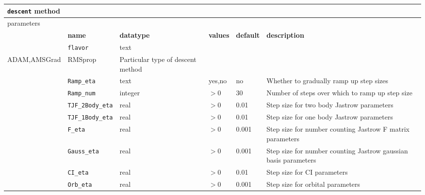 \begin{table}[H]
\begin{center}
\begin{tabularx}{\textwidth}{l l l l l X }
\hline
\multicolumn{6}{l}{\texttt{descent} method} \\
\hline
\multicolumn{2}{l}{parameters}  & \multicolumn{4}{l}{}\\
   &   \bfseries name     & \bfseries datatype & \bfseries values & \bfseries default   & \bfseries description \\
   &   \texttt{flavor} &  text     & \begin{tabular}{@{}c@{}}RMSprop,Random \\ ADAM,AMSGrad\end{tabular} & RMSprop & Particular type of descent method\\
   &   \texttt{Ramp\_eta} &  text     & yes,no & no & Whether to gradually ramp up step sizes\\
   &   \texttt{Ramp\_num} &  integer     & $>0$ & 30 & Number of steps over which to ramp up step size\\
   &   \texttt{TJF\_2Body\_eta} &  real     & $>0$ & 0.01 & Step size for two body Jastrow parameters\\
   &   \texttt{TJF\_1Body\_eta} &  real     & $>0$ & 0.01 & Step size for one body Jastrow parameters\\
   &   \texttt{F\_eta} &  real     & $>0$ & 0.001 & Step size for number counting Jastrow F matrix parameters\\
   &   \texttt{Gauss\_eta} &  real     & $>0$ & 0.001 & Step size for number counting Jastrow gaussian basis parameters\\
   &   \texttt{CI\_eta} &  real     & $>0$ & 0.01 & Step size for CI parameters\\
   &   \texttt{Orb\_eta} &  real     & $>0$ & 0.001 & Step size for orbital parameters\\
  \hline
\end{tabularx}
\end{center}
\end{table}

